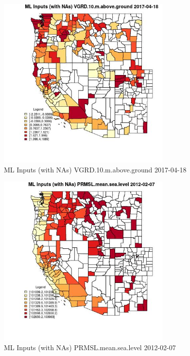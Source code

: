 \begin{figure} 
\centering  
\includegraphics[width=0.77\textwidth]{Code_Outputs/Report_ML_input_PM25_Step4_part_f_de_duplicated_aveswNAs_CountyVGRD10mabovegroundMean2017-04-18.jpg} 
\caption{\label{fig:Report_ML_input_PM25_Step4_part_f_de_duplicated_aveswNAsCountyVGRD10mabovegroundMean2017-04-18}ML Inputs (with NAs) VGRD.10.m.above.ground 2017-04-18} 
\end{figure} 
 

\begin{figure} 
\centering  
\includegraphics[width=0.77\textwidth]{Code_Outputs/Report_ML_input_PM25_Step4_part_f_de_duplicated_aveswNAs_CountyPRMSLmeansealevelMean2012-02-07.jpg} 
\caption{\label{fig:Report_ML_input_PM25_Step4_part_f_de_duplicated_aveswNAsCountyPRMSLmeansealevelMean2012-02-07}ML Inputs (with NAs) PRMSL.mean.sea.level 2012-02-07} 
\end{figure} 
 

